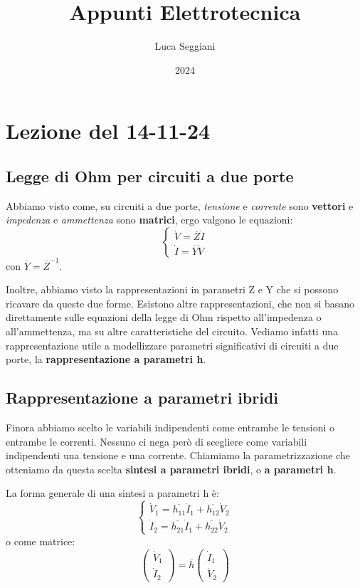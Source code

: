 \documentclass[a4paper,11pt]{article}
\title{Appunti Elettrotecnica}
\author{Luca Seggiani}
\date{2024}
\begin{document}
\section{Lezione del 14-11-24}

\thispagestyle{empty}
\pagestyle{fancy}

\subsection{Legge di Ohm per circuiti a due porte}
Abbiamo visto come, su circuiti a due porte, \textit{tensione} e \textit{corrente} sono \textbf{vettori} e \textit{impedenza} e \textit{ammettenza} sono \textbf{matrici}, ergo valgono le equazioni:
\[
	\begin{cases}
		\dot{V} = \overline{Z} \dot{I} \\ 
		\dot{I} = \overline{Y} \dot{V}
	\end{cases}
\]
con $\overline{Y} = \overline{Z}^{-1}$. 

Inoltre, abbiamo visto la rappresentazioni in parametri Z e Y che si possono ricavare da queste due forme.
Esistono altre rappresentazioni, che non si basano direttamente sulle equazioni della legge di Ohm rispetto all'impedenza o all'ammettenza, ma su altre caratteristiche del circuito.
Vediamo infatti una rappresentazione utile a modellizzare parametri significativi di circuiti a due porte, la \textbf{rappresentazione a parametri h}.

\subsection{Rappresentazione a parametri ibridi}
Finora abbiamo scelto le variabili indipendenti come entrambe le tensioni o entrambe le correnti. 
Nessuno ci nega però di scegliere come variabili indipendenti una tensione e una corrente.
Chiamiamo la parametrizzazione che otteniamo da questa scelta \textbf{sintesi a parametri ibridi}, o \textbf{a parametri h}.

La forma generale di una sintesi a parametri h è:
\[
	\begin{cases}
		\dot{V}_1 = \overline{h_{11}} \dot{I}_1 + \overline{h_{12}} \dot{V}_2 \\ 
		\dot{I}_2 = \overline{h_{21}} \dot{I}_1 + \overline{h_{22}} \dot{V}_2
	\end{cases}
\]
o come matrice:
$$
\begin{pmatrix}
	\dot{V}_1 \\ \dot{I}_2
\end{pmatrix}
= \overline{h}
\begin{pmatrix}
	\dot{I}_1 \\ \dot{V}_2
\end{pmatrix}
$$
\end{document}
